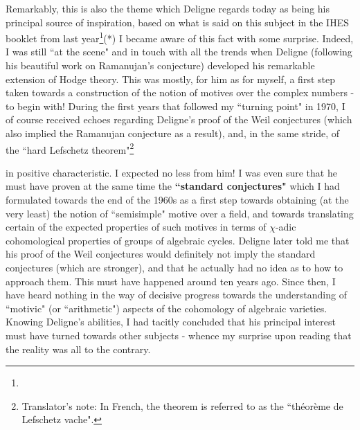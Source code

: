 Remarkably, this is also the theme which Deligne regards today as being his principal source of inspiration, based on what is said on this subject in the IHES booklet from last year\footnote{}(*) I became aware of this fact with some surprise. Indeed, I was still ``at the scene" and in touch with all the trends when Deligne (following his beautiful work on Ramanujan's conjecture) developed his remarkable extension of Hodge theory. This was mostly, for him as for myself, a first step taken towards a construction of the notion of motives over the complex numbers - to begin with! During the first years that followed my ``turning point" in 1970, I of course received echoes regarding Deligne's proof of the Weil conjectures (which also implied the Ramanujan conjecture as a result), and, in the same stride, of the ``hard Lefschetz theorem"\footnote{Translator's note: In French, the theorem is referred to as the ``th\'eor\`eme de Lefschetz vache".}
\addtocounter{footnote}{-1} in positive characteristic. I expected no less from him! I was even sure that he must have proven at the same time the \textbf{``standard conjectures"} which I had formulated towards the end of the 1960s as a first step towards obtaining (at the very least) the notion of ``semisimple" motive over a field, and towards translating certain of the expected properties of such motives in terms of $\chi$-adic cohomological properties of groups of algebraic cycles. Deligne later told me that his proof of the Weil conjectures would definitely not imply the standard conjectures (which are stronger), and that he actually had no idea as to how to approach them. This must have happened around ten years ago. Since then, I have heard nothing in the way of decisive progress towards the understanding of ``motivic" (or ``arithmetic") aspects of the cohomology of algebraic varieties. Knowing Deligne's abilities, I had tacitly concluded that his principal interest must have turned towards other subjects - whence my surprise upon reading that the reality was all to the contrary. 

